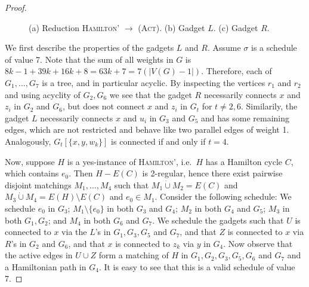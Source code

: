 \documentclass[runningheads]{llncs}
\numberwithin{equation}{section}
\newcommand{\set}[1]{\{ #1 \}}
\newcommand{\dotunion}{\mathbin{\dot{\cup}}}
\newcommand{\act}{\textsc{(Act)}}
\begin{document}
\begin{proof}
\begin{figure}[htpb]
\caption{(a) Reduction \textsc{Hamilton'} $\rightarrow$ {\act}. (b) Gadget $L$. (c) Gadget $R$.}
\label{fig_act_hamilton_cycle}
\end{figure}

We first describe the properties of the gadgets $L$ and $R$. Assume $\sigma$ is a schedule of value 7. Note that the sum of all weights in $G$ is $8k - 1 + 39k + 16k + 8 = 63k + 7 = 7(|V(G) - 1|)$. Therefore, each of $G_{1}, \ldots, G_{7}$ is a tree, and in particular acyclic. By inspecting the vertices $r_1$ and $r_2$ and using acyclity of $G_2, G_6$ we see that the gadget $R$ necessarily connects $x$ and $z_i$ in $G_2$ and $G_6$, but does not connect $x$ and $z_i$ in $G_t$ for $t \neq 2,6$. Similarily, the gadget $L$ necessarily connects $x$ and $u_i$ in $G_3$ and $G_5$ and has some remaining edges, which are not restricted and behave like two parallel edges of weight 1. Analogously, $G_{t}[\set{x, y, w_k}]$ is connected if and only if $t = 4$.

Now, suppose $H$ is a yes-instance of \textsc{Hamilton'}, i.e.\ $H$ has a Hamilton cycle $C$, which contains $e_0$. Then $H - E(C)$ is 2-regular, hence there exist pairwise disjoint matchings $M_1, \ldots, M_4$ such that $M_1 \dotunion M_2 = E(C)$ and $M_3 \dotunion M_4 = E(H) \setminus E(C)$ and $e_0 \in M_1$. Consider the following schedule: We schedule $e_0$ in $G_3$; $M_1 \setminus \set{e_0}$ in both $G_3$ and $G_4$; $M_2$ in both $G_4$ and $G_5$; $M_3$ in both $G_1, G_2$; and $M_4$ in both $G_6$ and $G_7$. We schedule the gadgets such that $U$ is connected to $x$ via the $L$'s in $G_1, G_3, G_5$ and $G_7$, and that $Z$ is connected to $x$ via $R$'s in $G_2$ and $G_6$, and that $x$ is connected to $z_k$ via $y$ in $G_4$. Now observe that the active edges in $U \cup Z$ form a matching of $H$ in $G_1, G_2, G_3, G_5, G_6$ and $G_7$ and a Hamiltonian path in $G_4$. It is easy to see that this is a valid schedule of value 7. 


\end{proof}
\end{document}
